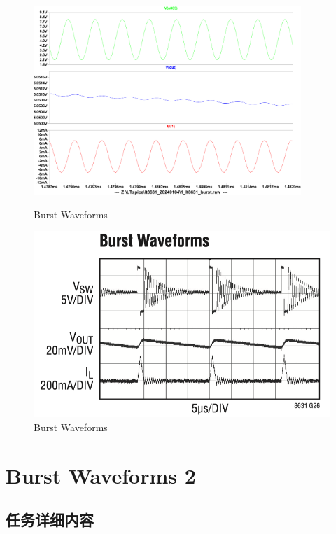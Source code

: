 \documentclass[lang=cn,10pt]{elegantbook}
\begin{document}
\begin{figure}[htbp]
    \centering\begin{minipage}[t]{0.48\textwidth}
        \centering\includegraphics[page=1, width=0.9\textwidth]{figure/G26.pdf}
        \caption{Burst Waveforms}
    \end{minipage}
    \centering\begin{minipage}[t]{0.48\textwidth}
        \centering\includegraphics[width=0.9\linewidth]{figure/datasheet_G26.png}
        \caption{Burst Waveforms}
    \end{minipage}
\end{figure}

\section{Burst Waveforms 2}

\subsection{任务详细内容}
\end{document}
